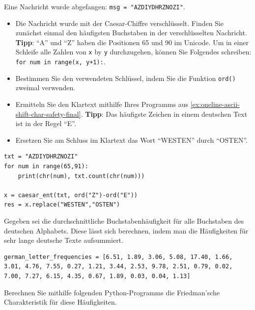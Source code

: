 \begin{myexercise}
Eine Nachricht wurde abgefangen: \lstinline|msg = "AZDIYDHRZNOZI"|.

\begin{itemize}
\item Die Nachricht wurde mit der Caesar-Chiffre verschlüsselt. Finden Sie  zunächst einmal den häufigsten Buchstaben in der verschlüsselten Nachricht. \textbf{Tipp}: ``A'' und ``Z'' haben die Positionen 65 und 90 im Unicode. Um in einer Schleife alle Zahlen von \texttt{x} by \texttt{y} durchzugehen, können Sie Folgendes schreiben: \lstinline|for num in range(x, y+1):|.

\item Bestimmen Sie den verwendeten Schlüssel, indem Sie die Funktion \lstinline|ord()| zweimal verwenden.

\item Ermitteln Sie den Klartext mithilfe Ihres Programms aus \cref{ex:oneline-ascii-shift-char-safety-final}. \textbf{Tipp}: Das häufigste Zeichen in einem deutschen Text ist in der Regel ``E''.

\item Ersetzen Sie am Schluss im Klartext das Wort ``WESTEN'' durch ``OSTEN''.

\end{itemize}
\begin{myanswer}
\begin{lstlisting}
txt = "AZDIYDHRZNOZI"
for num in range(65,91):
    print(chr(num), txt.count(chr(num)))
    
x = caesar_ent(txt, ord("Z")-ord("E"))
res = x.replace("WESTEN","OSTEN")
\end{lstlisting}
\end{myanswer}
\end{myexercise}

\begin{myexercise}
Gegeben sei die durchschnittliche Buchstabenhäufigkeit für alle Buchstaben des deutschen Alphabets. Diese lässt sich berechnen, indem man die Häufigkeiten für sehr lange deutsche Texte aufsummiert.

\begin{lstlisting}[numbers=none]
german_letter_frequencies = [6.51, 1.89, 3.06, 5.08, 17.40, 1.66, 3.01, 4.76, 7.55, 0.27, 1.21, 3.44, 2.53, 9.78, 2.51, 0.79, 0.02, 7.00, 7.27, 6.15, 4.35, 0.67, 1.89, 0.03, 0.04, 1.13]
\end{lstlisting}

Berechnen Sie mithilfe folgenden Python-Programms die Friedman'sche Charakteristik für diese Häufigkeiten.

\end{myexercise}


